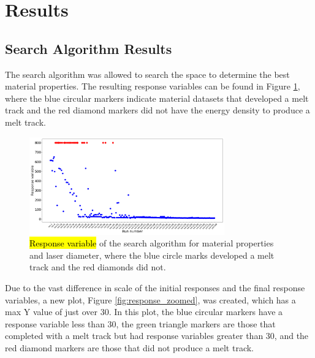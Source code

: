 \documentclass[metals,article,accept,pdftex,moreauthors]{Definitions/mdpi}
\begin{document}
\section{Results}
\subsection{Search Algorithm Results}
\label{results}

The search algorithm was allowed to search the space to determine the best material 
properties.  The resulting response variables can be found in Figure 
\ref{fig:response_complete}, where the blue circular markers indicate material datasets 
that developed a melt track and the red diamond markers did not have the energy density 
to produce a melt track.

\begin{figure}[H]
\includegraphics[width=0.75\textwidth]{response_complete}
\caption{\hl{Response variable} of the search algorithm for material properties and laser 
diameter, where the blue circle marks developed a melt track and the red diamonds did 
not.}%
\label{fig:response_complete}
\end{figure}

Due to the vast difference in scale of the initial responses and the final response variables, 
a new plot, Figure \ref{fig:response_zoomed}, was created, which has a max Y value of just over 30.  In this plot, the blue 
circular markers have a response variable less than 30, the green triangle markers are those 
that completed with a melt track but had response variables greater than 30, and the red 
diamond markers are those that did not produce a melt track.
\end{document}
